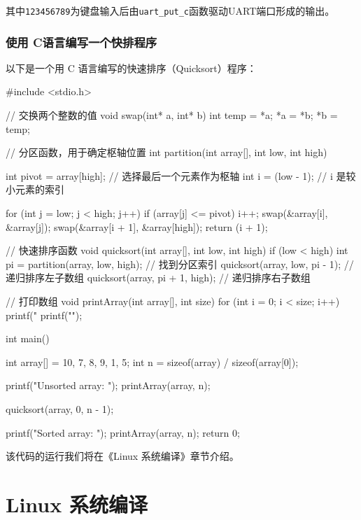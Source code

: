 其中\texttt{123456789}为键盘输入后由\texttt{uart\_put\_c}函数驱动UART端口形成的输出。

\subsubsection{使用 C语言编写一个快排程序}\label{sec:02-software-preparation-015}

以下是一个用 C 语言编写的快速排序（Quicksort）程序：

\begin{CodeBlock}[language=BookC]
#include <stdio.h>

// 交换两个整数的值
void swap(int* a, int* b) {
    int temp = *a;
    *a = *b;
    *b = temp;
}

// 分区函数，用于确定枢轴位置
int partition(int array[], int low, int high) {
    int pivot = array[high]; // 选择最后一个元素作为枢轴
    int i = (low - 1); // i 是较小元素的索引

    for (int j = low; j < high; j++) {
        if (array[j] <= pivot) {
            i++;
            swap(&array[i], &array[j]);
        }
    }
    swap(&array[i + 1], &array[high]);
    return (i + 1);
}

// 快速排序函数
void quicksort(int array[], int low, int high) {
    if (low < high) {
        int pi = partition(array, low, high); // 找到分区索引
        quicksort(array, low, pi - 1); // 递归排序左子数组
        quicksort(array, pi + 1, high); // 递归排序右子数组
    }
}

// 打印数组
void printArray(int array[], int size) {
    for (int i = 0; i < size; i++) {
        printf("%
    }
    printf("\n");
}

int main() {
    int array[] = {10, 7, 8, 9, 1, 5};
    int n = sizeof(array) / sizeof(array[0]);

    printf("Unsorted array: \n");
    printArray(array, n);

    quicksort(array, 0, n - 1);

    printf("Sorted array: \n");
    printArray(array, n);
    return 0;
}
\end{CodeBlock}

该代码的运行我们将在《Linux 系统编译》章节介绍。

\section{Linux 系统编译}\label{sec:02-software-preparation-016}

